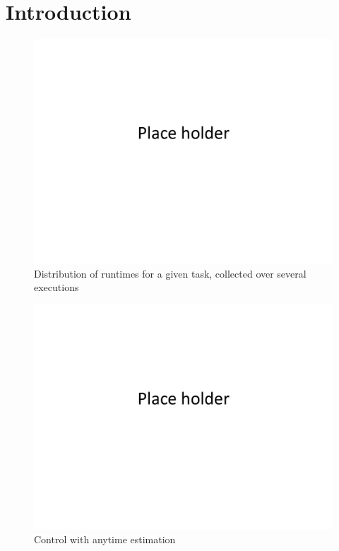 \section{Introduction}
\label{introduction}


\begin{figure}[t]
\centering
\includegraphics[width=0.7\linewidth]{figures/placeHolder}
\caption{Distribution of runtimes for a given task, collected over several executions}
\label{fig:extimeDsbn}
\end{figure}


\begin{figure}[t]
	\centering
	\includegraphics[width=0.7\linewidth]{figures/placeHolder}
	\caption{Control with anytime estimation}
	\label{fig:feedbackloop}
\end{figure}